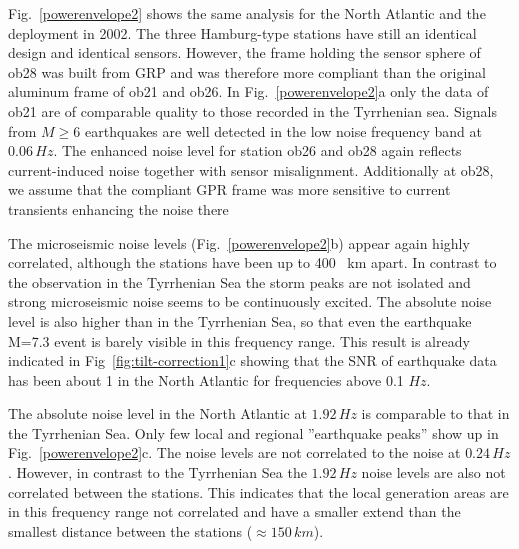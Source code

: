 \documentclass{article}
\begin{document}
{Fig.~\ref{powerenvelope2} shows the same analysis for the North Atlantic and 
the deployment in 2002.
The three Hamburg-type stations have still an identical design and identical sensors. 
However, the frame holding the sensor sphere of ob28 
was built from GRP and was therefore more compliant than 
the original aluminum frame of ob21 and ob26.
In Fig.~\ref{powerenvelope2}a only 
the data of ob21 are of comparable quality to those recorded
in the Tyrrhenian sea. 
Signals from $M\geq 6$ earthquakes are well detected in 
the low noise frequency band at $0.06\, Hz$. 
The enhanced noise level for station ob26 and ob28 
again reflects current-induced noise together 
with sensor misalignment.
Additionally at ob28, 
we assume that the compliant GPR frame 
was more sensitive to current transients 
enhancing the noise there

The microseismic noise levels (Fig.~\ref{powerenvelope2}b)
appear again highly correlated, although the stations have been 
up to 400 \, km apart.
In contrast to the observation in the Tyrrhenian Sea the 
storm peaks are not isolated and strong microseismic 
noise seems to be continuously excited.
The absolute noise level is also higher than in the 
Tyrrhenian Sea, so that 
even the earthquake M=7.3 event is barely
visible in this frequency range.
This result is already indicated in 
Fig~\ref{fig:tilt-correction1}c
showing that the 
SNR of earthquake data has been about 1 in the North Atlantic 
for frequencies above 0.1 $Hz$. 

The absolute noise level in the North Atlantic at 
$1.92\, Hz$
is comparable to that in the Tyrrhenian Sea.
Only 
few local and regional ''earthquake peaks'' show up
in Fig.~\ref{powerenvelope2}c.
The noise levels are not correlated to the noise at $0.24\, Hz$.
However, in contrast to the Tyrrhenian Sea the 
$1.92\,Hz$ noise levels are also  not correlated between  the 
stations. 
This indicates that the 
local generation areas are in this frequency range 
not correlated and have a smaller extend than 
the smallest distance between the stations 
($\approx 150 \, km$). 


}
\end{document}
